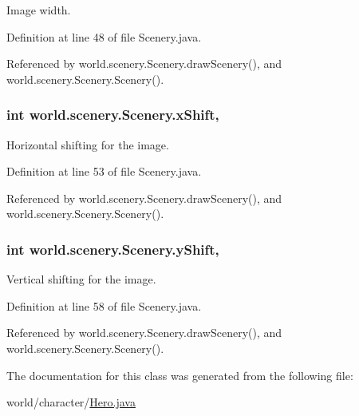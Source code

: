Image width. 



Definition at line 48 of file Scenery.\-java.



Referenced by world.\-scenery.\-Scenery.\-draw\-Scenery(), and world.\-scenery.\-Scenery.\-Scenery().

\hypertarget{classworld_1_1scenery_1_1_scenery_a0999f105f7630fd67fd9d440da6983aa}{
\subsubsection[{x\-Shift}]{\setlength{\rightskip}{0pt plus 5cm}int world.\-scenery.\-Scenery.\-x\-Shift\hspace{0.3cm}{\ttfamily [protected]}, {\ttfamily [inherited]}}}\label{classworld_1_1scenery_1_1_scenery_a0999f105f7630fd67fd9d440da6983aa}


Horizontal shifting for the image. 



Definition at line 53 of file Scenery.\-java.



Referenced by world.\-scenery.\-Scenery.\-draw\-Scenery(), and world.\-scenery.\-Scenery.\-Scenery().

\hypertarget{classworld_1_1scenery_1_1_scenery_ac9ca2c17cf6920deffe490c013b0e638}{
\subsubsection[{y\-Shift}]{\setlength{\rightskip}{0pt plus 5cm}int world.\-scenery.\-Scenery.\-y\-Shift\hspace{0.3cm}{\ttfamily [protected]}, {\ttfamily [inherited]}}}\label{classworld_1_1scenery_1_1_scenery_ac9ca2c17cf6920deffe490c013b0e638}


Vertical shifting for the image. 



Definition at line 58 of file Scenery.\-java.



Referenced by world.\-scenery.\-Scenery.\-draw\-Scenery(), and world.\-scenery.\-Scenery.\-Scenery().



The documentation for this class was generated from the following file\-:\begin{DoxyCompactItemize}
\item 
world/character/\hyperlink{_hero_8java}{Hero.\-java}\end{DoxyCompactItemize}
